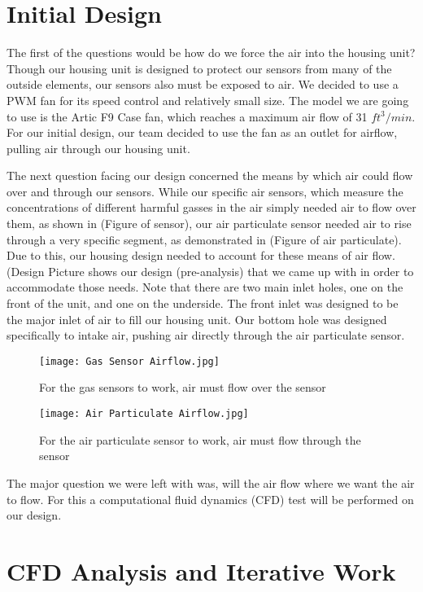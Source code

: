 \section{Initial Design}

The first of the questions would be how do we force the air into the housing unit? Though our housing unit is designed to protect our sensors from many of the outside elements, our sensors also must be exposed to air. We decided to use a PWM fan for its speed control and relatively small size. The model we are going to use is the Artic F9 Case fan, which reaches a maximum air flow of 31 $ft^{3}/min$. For our initial design, our team decided to use the fan as an outlet for airflow, pulling air through our housing unit.

The next question facing our design concerned the means by which air could flow over and through our sensors. While our specific air sensors, which measure the concentrations of different harmful gasses in the air simply needed air to flow over them, as shown in (Figure of sensor), our air particulate sensor needed air to rise through a very specific segment, as demonstrated in (Figure of air particulate). Due to this, our housing design needed to account for these means of air flow. (Design Picture shows our design (pre-analysis) that we came up with in order to accommodate those needs. Note that there are two main inlet holes, one on the front of the unit, and one on the underside. The front inlet was designed to be the major inlet of air to fill  our housing unit. Our bottom hole was designed specifically to intake air, pushing air directly through the air particulate sensor.

\begin{figure}[H]
	\centering
	\texttt{[image: Gas Sensor Airflow.jpg]}
	\caption{For the gas sensors to work, air must flow over the sensor}
	\label{fig:airflow1}
\end{figure}

\begin{figure}[H]
	\centering
	\texttt{[image: Air Particulate Airflow.jpg]}
	\caption{For the air particulate sensor to work, air must flow through the sensor}
	\label{fig:airflow2}
\end{figure}

The major question we were left with was, will the air flow where we want the air to flow. For this a computational fluid dynamics (CFD) test will be performed on our design.

\section{CFD Analysis and Iterative Work}

